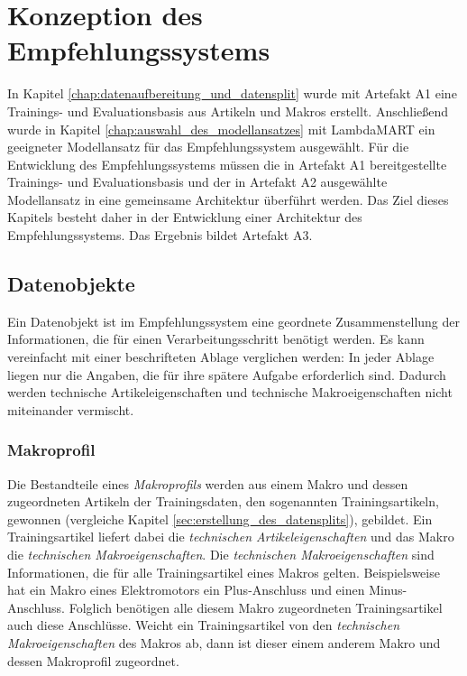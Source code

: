 ﻿\chapter{Konzeption des Empfehlungssystems} 
\label{chap:konzeption_des_empfehlungssystems} 

In Kapitel \ref{chap:datenaufbereitung_und_datensplit} wurde mit Artefakt A1 eine Trainings- und Evaluationsbasis aus Artikeln und Makros erstellt. 
Anschließend wurde in Kapitel \ref{chap:auswahl_des_modellansatzes} mit LambdaMART ein geeigneter Modellansatz für das Empfehlungssystem ausgewählt. 
Für die Entwicklung des Empfehlungssystems müssen die in Artefakt A1 bereitgestellte Trainings- und Evaluationsbasis und der in Artefakt A2 ausgewählte Modellansatz in eine gemeinsame Architektur überführt werden. 
Das Ziel dieses Kapitels besteht daher in der Entwicklung einer Architektur des Empfehlungssystems. Das Ergebnis bildet Artefakt A3. 

\section{Datenobjekte}
\label{sec:datenobjekte}

Ein Datenobjekt ist im Empfehlungssystem eine geordnete Zusammenstellung der Informationen, die für einen Verarbeitungsschritt benötigt werden. 
Es kann vereinfacht mit einer beschrifteten Ablage verglichen werden: In jeder Ablage liegen nur die Angaben, die für ihre spätere Aufgabe erforderlich sind. Dadurch werden technische Artikeleigenschaften und
technische Makroeigenschaften nicht miteinander vermischt.

\subsection{Makroprofil}
\label{sec:makroprofil}

Die Bestandteile eines \textit{Makroprofils} werden aus einem Makro und dessen zugeordneten Artikeln der Trainingsdaten, den sogenannten Trainingsartikeln, gewonnen  (vergleiche Kapitel \ref{sec:erstellung_des_datensplits}), gebildet. 
Ein Trainingsartikel liefert dabei die \textit{technischen Artikeleigenschaften} und das Makro die \textit{technischen Makroeigenschaften}.
Die \textit{technischen Makroeigenschaften} sind Informationen, die für alle Trainingsartikel eines Makros gelten. 
Beispielsweise hat ein Makro eines Elektromotors ein Plus-Anschluss und einen Minus-Anschluss. Folglich benötigen alle diesem Makro zugeordneten Trainingsartikel auch diese Anschlüsse.
Weicht ein Trainingsartikel von den \textit{technischen Makroeigenschaften} des Makros ab, dann ist dieser einem anderem Makro und dessen Makroprofil zugeordnet.

